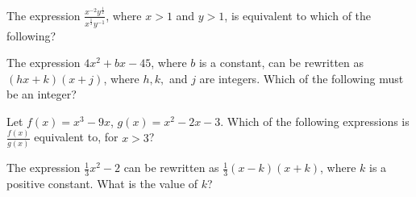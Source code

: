 \vspace{0.75em}



\vspace{2em}


\noindent\markforreview
\vspace{1em}

The expression \(\frac{x^{-2}y^{\frac{1}{2}}}{x^{\frac{1}{3}}y^{-1}}\), where \(x > 1\) and \(y > 1\), is equivalent to which of the following?

\vspace{0.75em}



\newpage

\noindent\markforreview
\vspace{1em}

The expression \(4x^2 + bx - 45\), where \(b\) is a constant,  
can be rewritten as \((hx + k)(x + j)\), where \(h, k,\) and \(j\) are integers.  
Which of the following must be an integer?

\vspace{0.75em}


\vspace{2em}


\noindent\markforreview
\vspace{1em}

Let \(f(x) = x^3 - 9x\), \(g(x) = x^2 - 2x - 3\).  
Which of the following expressions is \(\frac{f(x)}{g(x)}\) equivalent to, for \(x > 3\)?

\vspace{0.75em}


\newpage
\noindent\markforreview
\vspace{1em}

The expression \(\frac{1}{3}x^2 - 2\) can be rewritten as \(\frac{1}{3}(x - k)(x + k)\),  
where \(k\) is a positive constant. What is the value of \(k\)?

